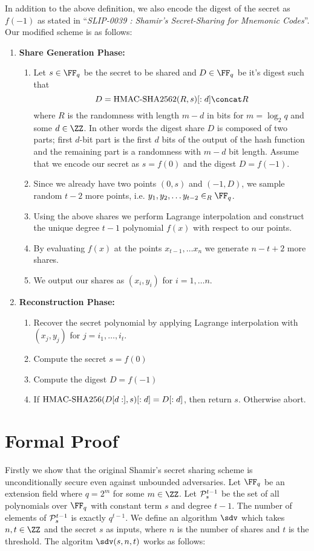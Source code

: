 \documentclass[envcountsame,runningheads,notitlepage]{llncs}
\begin{document}
	In addition to the above definition, we also encode the digest of the secret as $f(-1)$ as stated in ``\textit{SLIP-0039 : Shamir's Secret-Sharing for Mnemonic Codes}''. Our modified scheme is as follows:
	\begin{enumerate}
		\item \textbf{Share Generation Phase:}  
		\begin{enumerate}
			\item Let $s \in \FF_q$ be the secret to be shared and $D \in \FF_q$ be it's digest such that 
			\begin{equation*}
			D = \hsha2(R,s)[:d] \concat R
			\end{equation*} 
			where $R$ is the randomness with length $m - d$ in bits for $m = \log_{2}{q}$ and some $d \in \ZZ$. In other words the digest share $D$ is composed of two parts; first $d$-bit part is the first $d$ bits of the output of the hash function and the remaining part is a randomness with $m - d$ bit length. Assume that we encode our secret as $s = f(0)$ and the digest $D = f(-1)$.
			\item Since we already have two points $(0, s)$ and $(-1, D)$, we sample random $t-2$ more points, i.e. $y_{1}, y_{2}, \ldots y_{t-2} \in_{R} \FF_q$.
			\item Using the above shares we perform Lagrange interpolation and construct the unique degree $t - 1$ polynomial $f (x)$ with respect to our points.  
			\item By evaluating $f (x)$ at the points $x_{t - 1}, \ldots x_{n}$ we generate $n - t + 2$ more shares.
			\item We output our shares as $(x_{i},y_{i})$ for $i = 1, \ldots n$.
		\end{enumerate}
		\item \textbf{Reconstruction Phase:}  
		\begin{enumerate}
			\item Recover the secret polynomial by applying Lagrange interpolation with $(x_{j}, y_{j})$ for $j = i_{1}, \ldots, i_{t}$.
			\item Compute the secret $s = f(0)$
			\item Compute the digest $D = f(-1)$
			\item If ${\textrm{HMAC-SHA256}}(D[d:],s)[:d] = D[:d]$, then return $s$. Otherwise abort. 
		\end{enumerate}
	\end{enumerate}
	
	\section{Formal Proof}
	Firstly we show that the original Shamir's secret sharing scheme is unconditionally secure even against unbounded adversaries.
	Let $\FF_{q}$ be an extension field where $q = 2^{m}$ for some $m \in \ZZ$. 
	Let ${\mathcal P}_{s}^{t - 1}$ be the set of all polynomials over $\FF_{q}$ with constant term $s$ and degree $t - 1$.
	The number of elements of ${\mathcal P}_{s}^{t - 1}$ is exactly $q^{t-1}$. 
	We define an algorithm $\sdv$ which takes $n, t \in \ZZ$ and the secret $s$ as inputs, where $n$ is the number of shares and $t$ is the threshold. 
	The algoritm $\sdv(s, n, t)$ works as follows:
	
\end{document}
